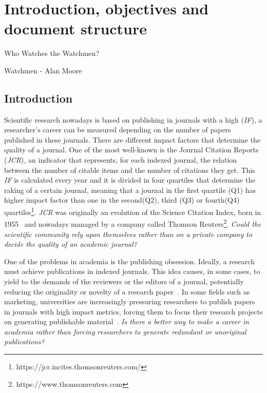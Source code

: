 
\chapter{Introduction, objectives and document structure}
\label{intro}
\begin{FraseCelebre}
  \begin{Frase}
    Who Watches the Watchmen?
  \end{Frase}
  \begin{Fuente}
    Watchmen - Alan Moore
  \end{Fuente}
\end{FraseCelebre}

\section{Introduction}

Scientific research nowadays is based on publishing in journals with a high
 (\emph{IF})\cite{doi:10.1001/jama.295.1.90}, a researcher's
career can be measured depending on the number of papers published in these
journals. There are different impact factors that determine the quality of a
journal. One of the most well-known is the Journal Citation Reports
(\emph{JCR}), an indicator that represents, for each indexed journal, the
relation between the number of citable items and the number of citations they
get. This \emph{IF} is calculated every year and it is divided in four quartiles
that determine the raking of a certain journal, meaning that a journal in the
first quartile (Q1) has higher impact factor than one in the second(Q2), third
(Q3) or fourth(Q4) quartiles\footnote{https://jcr.incites.thomsonreuters.com/}.
\emph{JCR} was originally an evolution of the Science Citation Index, born in
1955~\cite{garfield2007evolution} and nowadays managed by a company called
Thomson Reuters\footnote{https://www.thomsonreuters.com}. \emph{ Could the
  scientific community rely upon themselves rather than on a private company to
  decide the quality of an academic journal?}

One of the problems in academia is the publishing obsession. Ideally, a research
must achieve publications in indexed journals. This idea causes, in some cases,
to yield to the demands of the reviewers or the editors of a journal,
potentially reducing the originality or novelty of a research
paper~\cite{Frey2003}. In some fields such as marketing, universities are
increasingly pressuring researchers to publish papers in journals with high
impact metrics, forcing them to focus their research projects on generating
publishable material~\cite{ortinau2011writing}. \emph{ Is there a better way to
  make a career in academia rather than forcing researchers to generate
  redundant or unoriginal publications?}

